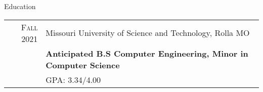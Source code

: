 \documentclass{resume}
\begin{document}



\begin{rSection}{Education}
    \small
    {
        \begin{tabular}{r|p{15cm}}
            \textsc{Fall} 2021 & Missouri University of Science and Technology, Rolla MO  \\
                              & \textbf{Anticipated B.S Computer Engineering, Minor in Computer Science} \\
                              & GPA: 3.34/4.00 \\
        \end{tabular}
    }
\end{rSection}
\end{document}
